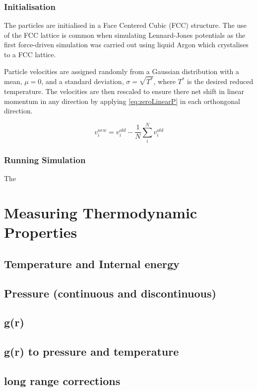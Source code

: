 \message{ !name(main.tex)}\documentclass[12pt]{UoAthesis}
\begin{document}
\subsection{Initialisation} The particles are initialised in a Face Centered
Cubic (FCC)  structure. The
use of the FCC lattice is common when simulating Lennard-Jones
potentials as the first force-driven simulation \cite{Rahman1964} was
carried out using liquid Argon which crystalises to a FCC lattice.

Particle velocities are assigned randomly from a Gaussian distribution
with a mean, $\mu = 0$, and a standard deviation, $\sigma =
\sqrt{T^{*}}$, where $T^{*}$ is the desired reduced temperature. The
velocities are then rescaled to ensure there net shift in linear
momentum in any direction by applying \eqref{eq:zeroLinearP} in each
orthongonal direction.

\begin{equation} 
  v_{i}^{new} = v_{i}^{old} - \frac{1}{N}
  \sum^{N}_{i}v_{i}^{old}
  \label{eq:zeroLinearP} 
\end{equation}

\subsection{Running Simulation} 
The


\chapter{Measuring Thermodynamic Properties}

\section{Temperature and Internal energy }
\section{Pressure (continuous and discontinuous)}
\section{g(r)}
\section{g(r) to pressure and temperature}
\section{long range corrections}
\end{document}
